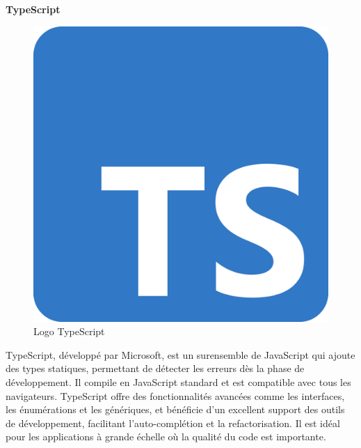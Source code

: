 \large 
\textbf{TypeScript}
\begin{figure}[htbp]
   \centering
   \includegraphics[scale=0.05]{Images/ts.png} 
   \caption{Logo TypeScript}
   \label{fig:ts}
\end{figure}

TypeScript, développé par Microsoft, est un surensemble de 
JavaScript qui ajoute des types statiques, permettant de détecter 
les erreurs dès la phase de développement. Il compile en JavaScript 
standard et est compatible avec tous les navigateurs. 
TypeScript offre des fonctionnalités avancées comme les 
interfaces, les énumérations et les génériques, et bénéficie 
d'un excellent support des outils de développement, facilitant 
l'auto-complétion et la refactorisation. Il est idéal pour les 
applications à grande échelle où la qualité du code est importante.
\newline

